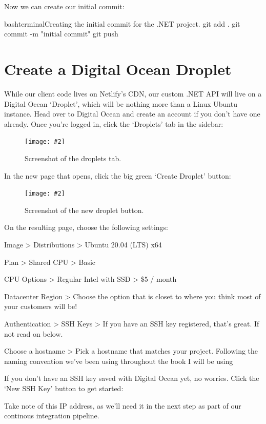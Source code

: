 \documentclass[paper=6in:9in,pagesize=pdftex,headinclude=on,footinclude=on,12pt,twoside]{scrbook}
\newcommand{\standardfigure}[3]{\begin{figure}[H]\begin{center}\texttt{[image: \#2]}\caption{#3}\label{fig:#2}\end{center}\end{figure}}
\begin{document}
Now we can create our initial commit:

\begin{codeInput}{bash}{terminal}{Creating the initial commit for the .NET project.}
git add .
git commit -m "initial commit"
git push
\end{codeInput}

\section{Create a Digital Ocean Droplet}

While our client code lives on Netlify's CDN, our custom .NET API will live on a Digital Ocean `Droplet', which will be nothing more than a Linux Ubuntu instance. Head over to Digital Ocean and create an account if you don't have one already. Once you're logged in, click the `Droplets' tab in the sidebar:

\standardfigure{\textwidth/2}{droplet/droplets-tab}{Screenshot of the droplets tab.}

In the new page that opens, click the big green `Create Droplet' button:

\standardfigure{\textwidth}{droplet/new-droplet}{Screenshot of the new droplet button.}

On the resulting page, choose the following settings:

\begin{arrows}
\item Image > Distributions > Ubuntu 20.04 (LTS) x64
\item Plan > Shared CPU > Basic
\item CPU Options > Regular Intel with SSD > \$5 / month
\item Datacenter Region > Choose the option that is closet to where you think most of your customers will be!
\item Authentication > SSH Keys > If you have an SSH key registered, that's great. If not read on below.
\item Choose a hostname > Pick a hostname that matches your project. Following the naming convention we've been using throughout the book I will be using 
\end{arrows}


If you don't have an SSH key saved with Digital Ocean yet, no worries. Click the `New SSH Key' button to get started:

Take note of this IP address, as we'll need it in the next step as part of our continous integration pipeline.
\end{document}
